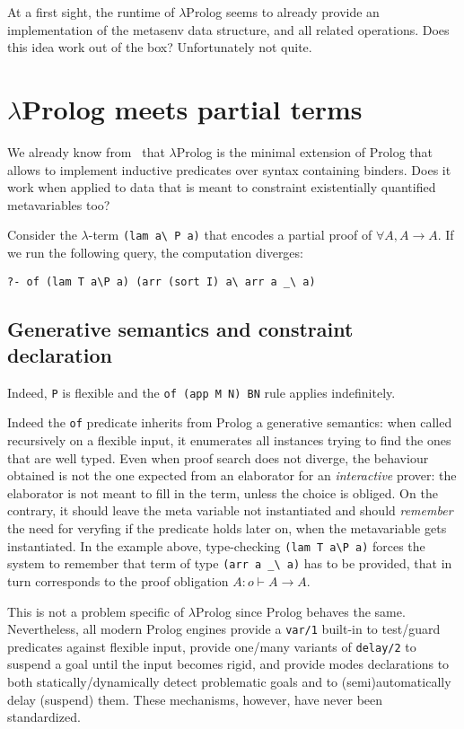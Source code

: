 \documentclass{easychair}
\begin{document}
At a first sight, the runtime of $\lambda$Prolog seems to already provide
an implementation of the metasenv data structure, and all related operations.
Does this idea work out of the box? Unfortunately not quite.

\section{$\lambda$Prolog meets partial terms}

We already know from~\cite{jlp98} that $\lambda$Prolog is the minimal
extension of Prolog that allows to implement inductive predicates over
syntax containing binders. Does it work when applied to data that is
meant to constraint existentially quantified metavariables too?

Consider the $\lambda$-term \verb+(lam a\ P a)+ that encodes a
partial proof of $\forall A, A \to A$.
If we run the following query, the computation diverges:

\begin{verbatim}
?- of (lam T a\P a) (arr (sort I) a\ arr a _\ a)
\end{verbatim}

\subsection{Generative semantics and constraint declaration} %
\label{sec:delay}

Indeed, \verb+P+ is flexible and the \verb+of (app M N) BN+
rule applies indefinitely.

Indeed the \verb+of+ predicate inherits from Prolog a generative semantics:
when called recursively on a flexible input, it enumerates all
instances trying to find the ones that are well typed. Even when proof
search does not diverge, the behaviour obtained is not the one
expected from an elaborator for an \emph{interactive} prover: the
elaborator is not meant to fill in the term, unless the choice is
obliged. On the contrary, it should leave the meta variable not
instantiated and should \emph{remember} the need for
veryfing if the predicate holds later on, when the metavariable gets
instantiated. In the example above, type-checking \verb+(lam T a\P a)+ forces
the system to remember that term of type \verb+(arr a _\ a)+ has to be
provided, that in turn corresponds to the proof obligation
$A : o \vdash A \to A $.

This is not a problem specific of $\lambda$Prolog since Prolog behaves the same.
Nevertheless, all modern Prolog engines provide a \verb+var/1+ built-in to
test/guard predicates against flexible input, provide one/many variants of
\verb+delay/2+ to suspend a goal until the input becomes rigid, and provide
modes declarations to both statically/dynamically detect problematic goals
and to (semi)automatically delay (suspend) them.
These mechanisms, however, have never been standardized.
\end{document}
